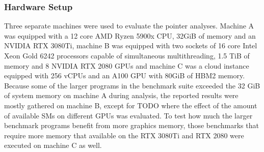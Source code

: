 \subsubsection{Hardware Setup}
Three separate machines were used to evaluate the pointer analyses.
Machine A was equipped with a 12 core AMD Ryzen 5900x CPU, 32GiB of memory and an NVIDIA RTX 3080Ti, machine B was equipped with two sockets of 16 core Intel Xeon Gold 6242 processors capable of simultaneous multithreading, 1.5 TiB of memory and 8 NVIDIA RTX 2080 GPUs and machine C was a cloud instance equipped with 256 vCPUs and an A100 GPU with 80GiB of HBM2 memory.
Because some of the larger programs in the benchmark suite exceeded the 32 GiB of system memory on machine A during analysis, the reported results were mostly gathered on machine B, except for TODO where the effect of the amount of available SMs on different GPUs was evaluated.
To test how much the larger benchmark programs benefit from more graphics memory, those benchmarks that require more memory that available on the RTX 3080Ti and RTX 2080 were executed on machine C as well.

